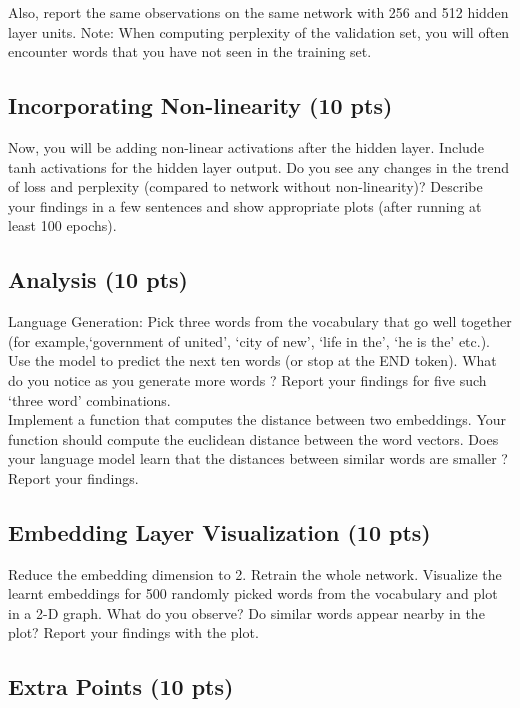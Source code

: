 \documentclass[10pt]{article}
\begin{document}
Also, report the same observations on the same network with 256 and 512 hidden layer units.
Note: When computing perplexity of the validation set, you will often encounter words that you have not seen in the training set.

\subsection{Incorporating Non-linearity (10 pts)}

Now, you will be adding non-linear activations after the hidden layer. Include tanh activations for the hidden layer output. Do you see any changes in the trend of loss and perplexity (compared to network without non-linearity)? Describe your findings in a few sentences and show appropriate plots (after running at least 100 epochs).

\subsection{Analysis (10 pts)}

Language Generation: Pick three words from the vocabulary that go well together (for example,‘government of united’, ‘city of new’, ‘life in the’, ‘he is the’ etc.). Use the model to predict the next ten words (or stop at the END token). What do you notice as you generate more words ? Report your findings for five such `three word' combinations. 
\\

Implement a function that computes the distance between two embeddings. Your function should compute the euclidean distance between the word vectors. Does your language model learn that the distances between similar words are smaller ? Report your findings.

\subsection{Embedding Layer Visualization (10 pts)}

Reduce the embedding dimension to 2. Retrain the whole network. Visualize the learnt embeddings for 500 randomly picked words from the vocabulary and plot in a 2-D graph. What do you observe? Do similar words appear nearby in the plot? Report your findings with the plot.


\subsection{Extra Points (10 pts)}
\end{document}
